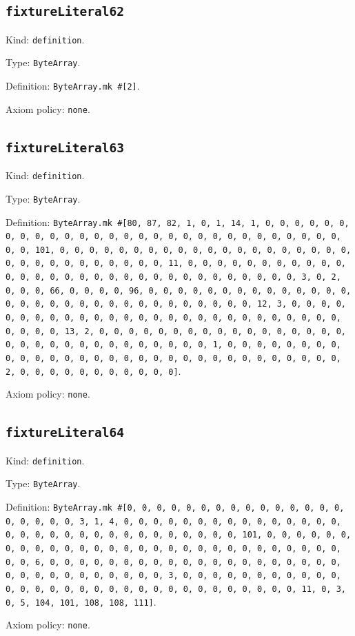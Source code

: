 \documentclass[11pt]{article}
\begin{document}
\subsection*{\texttt{fixtureLiteral62}}
\noindent Kind: \texttt{definition}.\par
\noindent Type: \texttt{ByteArray}.\par
\noindent Definition: \texttt{ByteArray.mk \#[2]}.\par
\noindent Axiom policy: \texttt{none}.\par
\subsection*{\texttt{fixtureLiteral63}}
\noindent Kind: \texttt{definition}.\par
\noindent Type: \texttt{ByteArray}.\par
\noindent Definition: \texttt{ByteArray.mk \#[80, 87, 82, 1, 0, 1, 14, 1, 0, 0, 0, 0, 0, 0, 0, 0, 0, 0, 0, 0, 0, 0, 0, 0, 0, 0, 0, 0, 0, 0, 0, 0, 0, 0, 0, 0, 0, 0, 0, 101, 0, 0, 0, 0, 0, 0, 0, 0, 0, 0, 0, 0, 0, 0, 0, 0, 0, 0, 0, 0, 0, 0, 0, 0, 0, 0, 0, 0, 0, 0, 0, 11, 0, 0, 0, 0, 0, 0, 0, 0, 0, 0, 0, 0, 0, 0, 0, 0, 0, 0, 0, 0, 0, 0, 0, 0, 0, 0, 0, 0, 0, 0, 0, 3, 0, 2, 0, 0, 0, 66, 0, 0, 0, 0, 96, 0, 0, 0, 0, 0, 0, 0, 0, 0, 0, 0, 0, 0, 0, 0, 0, 0, 0, 0, 0, 0, 0, 0, 0, 0, 0, 0, 0, 0, 0, 0, 12, 3, 0, 0, 0, 0, 0, 0, 0, 0, 0, 0, 0, 0, 0, 0, 0, 0, 0, 0, 0, 0, 0, 0, 0, 0, 0, 0, 0, 0, 0, 0, 0, 13, 2, 0, 0, 0, 0, 0, 0, 0, 0, 0, 0, 0, 0, 0, 0, 0, 0, 0, 0, 0, 0, 0, 0, 0, 0, 0, 0, 0, 0, 0, 0, 0, 1, 0, 0, 0, 0, 0, 0, 0, 0, 0, 0, 0, 0, 0, 0, 0, 0, 0, 0, 0, 0, 0, 0, 0, 0, 0, 0, 0, 0, 0, 0, 0, 2, 0, 0, 0, 0, 0, 0, 0, 0, 0, 0, 0]}.\par
\noindent Axiom policy: \texttt{none}.\par
\subsection*{\texttt{fixtureLiteral64}}
\noindent Kind: \texttt{definition}.\par
\noindent Type: \texttt{ByteArray}.\par
\noindent Definition: \texttt{ByteArray.mk \#[0, 0, 0, 0, 0, 0, 0, 0, 0, 0, 0, 0, 0, 0, 0, 0, 0, 0, 0, 0, 3, 1, 4, 0, 0, 0, 0, 0, 0, 0, 0, 0, 0, 0, 0, 0, 0, 0, 0, 0, 0, 0, 0, 0, 0, 0, 0, 0, 0, 0, 0, 0, 0, 0, 101, 0, 0, 0, 0, 0, 0, 0, 0, 0, 0, 0, 0, 0, 0, 0, 0, 0, 0, 0, 0, 0, 0, 0, 0, 0, 0, 0, 0, 0, 0, 0, 6, 0, 0, 0, 0, 0, 0, 0, 0, 0, 0, 0, 0, 0, 0, 0, 0, 0, 0, 0, 0, 0, 0, 0, 0, 0, 0, 0, 0, 0, 0, 0, 3, 0, 0, 0, 0, 0, 0, 0, 0, 0, 0, 0, 0, 0, 0, 0, 0, 0, 0, 0, 0, 0, 0, 0, 0, 0, 0, 0, 0, 0, 0, 0, 11, 0, 3, 0, 5, 104, 101, 108, 108, 111]}.\par
\noindent Axiom policy: \texttt{none}.\par
\end{document}
